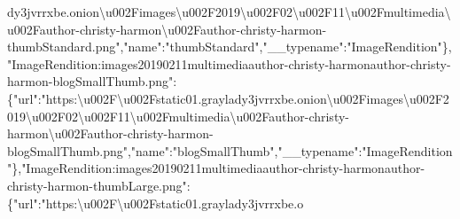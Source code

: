 dy3jvrrxbe.onion\textbackslash{}u002Fimages\textbackslash{}u002F2019\textbackslash{}u002F02\textbackslash{}u002F11\textbackslash{}u002Fmultimedia\textbackslash{}u002Fauthor-christy-harmon\textbackslash{}u002Fauthor-christy-harmon-thumbStandard.png","name":"thumbStandard","\_\_typename":"ImageRendition"\},"ImageRendition:images20190211multimediaauthor-christy-harmonauthor-christy-harmon-blogSmallThumb.png":\{"url":"https:\textbackslash{}u002F\textbackslash{}u002Fstatic01.graylady3jvrrxbe.onion\textbackslash{}u002Fimages\textbackslash{}u002F2019\textbackslash{}u002F02\textbackslash{}u002F11\textbackslash{}u002Fmultimedia\textbackslash{}u002Fauthor-christy-harmon\textbackslash{}u002Fauthor-christy-harmon-blogSmallThumb.png","name":"blogSmallThumb","\_\_typename":"ImageRendition"\},"ImageRendition:images20190211multimediaauthor-christy-harmonauthor-christy-harmon-thumbLarge.png":\{"url":"https:\textbackslash{}u002F\textbackslash{}u002Fstatic01.graylady3jvrrxbe.o
